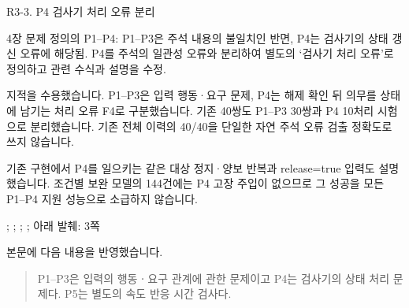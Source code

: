 \begin{reviewitem}{R3-3. P4 검사기 처리 오류 분리}

\begin{reviewercomment}

4장 문제 정의의 P1–P4: P1–P3은 주석 내용의 불일치인 반면, P4는 검사기의 상태 갱신 오류에 해당됨. P4를 주석의 일관성 오류와 분리하여 별도의 ‘검사기 처리 오류’로 정의하고 관련 수식과 설명을 수정.

\end{reviewercomment}

\begin{authorresponse}

지적을 수용했습니다. P1–P3은 입력 행동·요구 문제, P4는 해제 확인 뒤 의무를 상태에 남기는 처리 오류 F4로 구분했습니다. 기존 40쌍도 P1–P3 30쌍과 P4 10처리 시험으로 분리했습니다. 기존 전체 이력의 40/40을 단일한 자연 주석 오류 검출 정확도로 쓰지 않습니다.

기존 구현에서 P4를 일으키는 같은 대상 정지·양보 반복과 release=true 입력도 설명했습니다. 조건별 보완 모델의 144건에는 P4 고장 주입이 없으므로 그 성공을 모든 P1–P4 지원 성능으로 소급하지 않습니다.

\end{authorresponse}

\begin{manuscriptrevision}{; ; ; ; 아래 발췌: 3쪽}

본문에 다음 내용을 반영했습니다.

\begin{quote}

P1--P3은 입력의 행동ㆍ요구 관계에 관한 문제이고 P4는 검사기의 상태 처리 문제다. P5는 별도의 속도 반응 시간 검사다.

\end{quote}

\end{manuscriptrevision}

\end{reviewitem}

\clearpage

